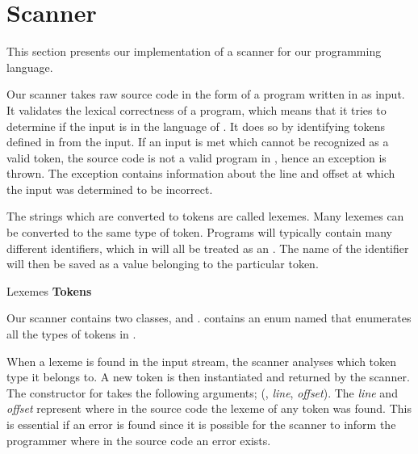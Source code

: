 \section{Scanner}
\label{sec:scannerimplementation}
This section presents our implementation of a scanner for our programming language.

Our scanner takes raw source code in the form of a program written in \productname{} as input. It validates the lexical correctness of a \productname{} program, which means that it tries to determine if the input is in the language of \productname{}. It does so by identifying tokens defined in \productname{} from the input. If an input is met which cannot be recognized as a valid token, the source code is not a valid program in \productname{}, hence an exception is thrown. The exception contains information about the line and offset at which the input was determined to be incorrect.

The strings which are converted to tokens are called lexemes. Many lexemes can be converted to the same type of token. Programs will typically contain many different identifiers, which in \productname{} will all be treated as an . The name of the identifier will then be saved as a value belonging to the particular token.

                 {						}
       {Lexemes	}{\textbf{Tokens}		}{
\tabrow{$[$    	}{ LBRACKET				}
\tabrow{$]$		}{ RBRACKET 			}
}

Our scanner contains two classes,  and .  contains an enum named  that enumerates all the types of tokens in \productname{}. 

When a lexeme is found in the input stream, the scanner analyses which token type it belongs to. A new token is then instantiated and returned by the scanner. The constructor for  takes the following arguments; (, \textit{line}, \textit{offset}). The \textit{line} and \textit{offset} represent where in the source code the lexeme of any token was found. This is essential if an error is found since it is possible for the scanner to inform the programmer where in the source code an error exists.

